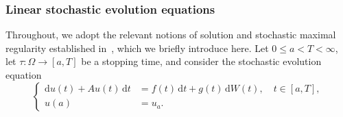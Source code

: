 \documentclass[reqno]{amsart}
\newcommand{\1}{\mathbf{1}}
\newcommand{\dd}{\ensuremath{\mathrm{d}}}
\begin{document}
\subsubsection{Linear stochastic evolution equations}
Throughout, we adopt the relevant notions of solution and stochastic maximal regularity established in~\cite{agrestiNonlinearParabolicStochastic2022,agrestiNonlinearParabolicStochastic2022a,agrestiNonlinearSPDEsMaximal2025}, which we briefly introduce here. 
Let $0\le a < T<\infty$, let $\tau\colon\Omega\to[a,T]$ be a stopping time, and
consider the stochastic evolution equation
\begin{equation}\label{eq:linear-stochastic-evolution}
\left\{
\begin{aligned}
    \dd  u(t)+Au(t)\,\dd t
        &= f(t)\,\dd  t
        +g(t)\,\dd W(t),\quad t\in[a,T],\\
    u(a)&=u_a.
\end{aligned}\right.
\end{equation}
\end{document}
